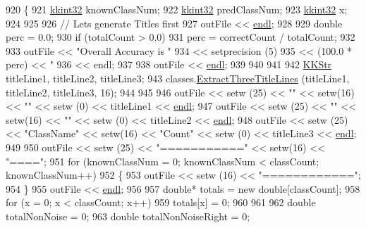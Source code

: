 \begin{DoxyCode}
920 \{
921   \hyperlink{namespace_k_k_b_a8fa4952cc84fda1de4bec1fbdd8d5b1b}{kkint32} knownClassNum;
922   \hyperlink{namespace_k_k_b_a8fa4952cc84fda1de4bec1fbdd8d5b1b}{kkint32} predClassNum;
923   \hyperlink{namespace_k_k_b_a8fa4952cc84fda1de4bec1fbdd8d5b1b}{kkint32} x;
924 
925  
926   \textcolor{comment}{// Lets generate Titles first}
927   outFile << \hyperlink{namespace_k_k_b_ad1f50f65af6adc8fa9e6f62d007818a8}{endl};
928 
929   \textcolor{keywordtype}{double}  perc = 0.0;
930   \textcolor{keywordflow}{if}  (totalCount > 0.0)
931     perc = correctCount / totalCount;
932 
933   outFile  << \textcolor{stringliteral}{"Overall Accuracy is "} 
934            << setprecision (5)
935            << (100.0 * perc) << \textcolor{stringliteral}{"%
936            << endl;
937 
938   outFile  << \hyperlink{namespace_k_k_b_ad1f50f65af6adc8fa9e6f62d007818a8}{endl};
939    
940 
941 
942   \hyperlink{class_k_k_b_1_1_k_k_str}{KKStr}  titleLine1, titleLine2, titleLine3;
943   classes.\hyperlink{class_k_k_m_l_l_1_1_m_l_class_list_ab333df46b706048637bb7b98ef552f59}{ExtractThreeTitleLines} (titleLine1, titleLine2, titleLine3, 16);
944 
945 
946   outFile << setw (25) << \textcolor{stringliteral}{""}          << setw(16) << \textcolor{stringliteral}{""}      << setw (0) << titleLine1 << 
      \hyperlink{namespace_k_k_b_ad1f50f65af6adc8fa9e6f62d007818a8}{endl};
947   outFile << setw (25) << \textcolor{stringliteral}{""}          << setw(16) << \textcolor{stringliteral}{""}      << setw (0) << titleLine2 << 
      \hyperlink{namespace_k_k_b_ad1f50f65af6adc8fa9e6f62d007818a8}{endl};
948   outFile << setw (25) << \textcolor{stringliteral}{"ClassName"} << setw(16) << \textcolor{stringliteral}{"Count"} << setw (0) << titleLine3 << 
      \hyperlink{namespace_k_k_b_ad1f50f65af6adc8fa9e6f62d007818a8}{endl};
949 
950   outFile << setw (25) << \textcolor{stringliteral}{"==========="}  << setw(16) << \textcolor{stringliteral}{"===="};
951   \textcolor{keywordflow}{for}  (knownClassNum = 0;  knownClassNum < classCount;  knownClassNum++)
952   \{
953     outFile << setw (16) << \textcolor{stringliteral}{"============"};
954   \}
955   outFile << \hyperlink{namespace_k_k_b_ad1f50f65af6adc8fa9e6f62d007818a8}{endl};
956 
957   \textcolor{keywordtype}{double}*  totals = \textcolor{keyword}{new} \textcolor{keywordtype}{double}[classCount];
958   \textcolor{keywordflow}{for}  (x = 0; x < classCount; x++)
959     totals[x] = 0;
960 
961 
962   \textcolor{keywordtype}{double}  totalNonNoise = 0;
963   \textcolor{keywordtype}{double}  totalNonNoiseRight = 0;
}
\end{DoxyCode}

